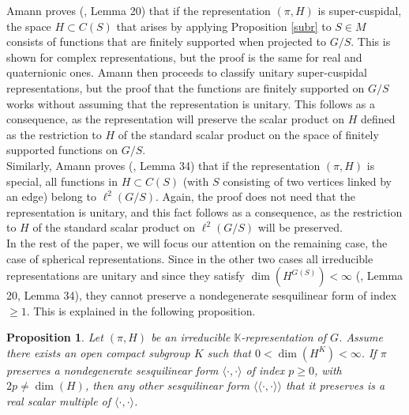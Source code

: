\documentclass{article}
\theoremstyle{definition}
\theoremstyle{remark}
\theoremstyle{plain}
\newtheorem{prp}[dfn]{Proposition}
\begin{document}
Amann proves (\cite{amann}, Lemma 20) that if the representation $(\pi,H)$ is super-cuspidal, the space $H\subset C(S)$ that arises by applying Proposition \ref{subr} to $S\in M$ consists of functions that are finitely supported when projected to $G/S$. This is shown for complex representations, but the proof is the same for real and quaternionic ones. Amann then proceeds to classify unitary super-cuspidal representations, but the proof that the functions are finitely supported on $G/S$ works without assuming that the representation is unitary. This follows as a consequence, as the representation will preserve the scalar product on $H$ defined as the restriction to $H$ of the standard scalar product on the space of finitely supported functions on $G/S$. \\

Similarly, Amann proves (\cite{amann}, Lemma 34) that if the representation $(\pi,H)$ is special, all functions in $H\subset C(S)$ (with $S$ consisting of two vertices linked by an edge) belong to $\ell^2(G/S)$. Again, the proof does not need that the representation is unitary, and this fact follows as a consequence, as the restriction to $H$ of the standard scalar product on $\ell^2(G/S)$ will be preserved. \\

In the rest of the paper, we will focus our attention on the remaining case, the case of spherical representations. Since in the other two cases all irreducible representations are unitary and since they satisfy $\dim(H^{G(S)})<\infty$ (\cite{amann}, Lemma 20, Lemma 34), they cannot preserve a nondegenerate sesquilinear form of index $\geq 1$. This is explained in the following proposition. \\

\begin{prp} \label{uniqueform}
Let $(\pi,H)$ be an irreducible $\mathbb{K}$-representation of $G$. Assume there exists an open compact subgroup $K$ such that $0<\dim(H^K)<\infty$. If $\pi$ preserves a nondegenerate sesquilinear form $\langle\cdot,\cdot\rangle$ of index $p\geq 0$, with $2p\neq\dim(H)$, then any other sesquilinear form $\langle\langle\cdot,\cdot\rangle\rangle$ that it preserves is a real scalar multiple of $\langle\cdot,\cdot\rangle$.
\end{prp}
\end{document}
